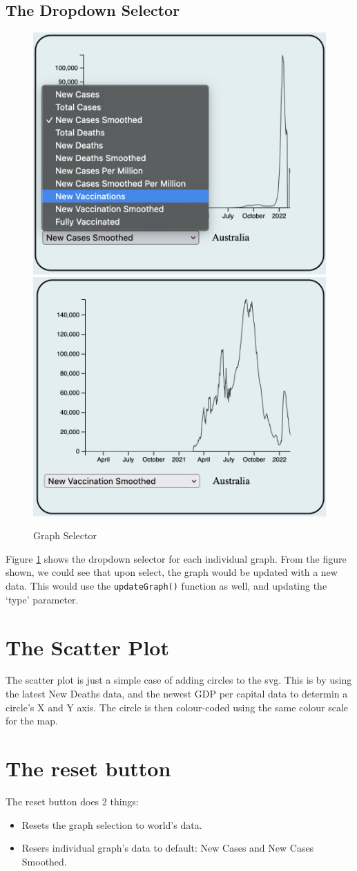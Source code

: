 \documentclass{scrreprt}
\begin{document}
\subsection{The Dropdown Selector}
\begin{figure}[H]
    \centering
    \includegraphics[height=0.3\textwidth]{images/selector_1.png}
    \includegraphics[height=0.3\textwidth]{images/selector_2.png}
    \caption{Graph Selector}
    \label{fig:graph-selector}
\end{figure}
Figure \ref{fig:graph-selector} shows the dropdown selector for each individual graph. From the figure shown, we could see that upon select, the graph would be updated with a new data. This would use the \verb|updateGraph()| function as well, and updating the `type' parameter.

\section{The Scatter Plot}
The scatter plot is just a simple case of adding circles to the svg. This is by using the latest New Deaths data, and the newest GDP per capital data to determin a circle's X and Y axis. The circle is then colour-coded using the same colour scale for the map. 

\section{The reset button}
The reset button does 2 things:
\begin{itemize}
    \item Resets the graph selection to world's data.
    \item Resers individual graph's data to default: New Cases and New Cases Smoothed.
\end{itemize}
\end{document}
